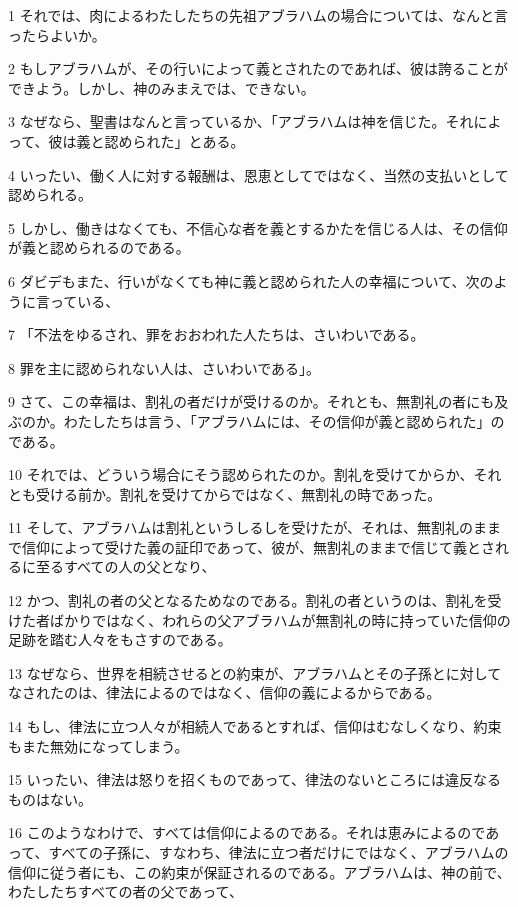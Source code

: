 \par 1 それでは、肉によるわたしたちの先祖アブラハムの場合については、なんと言ったらよいか。
\par 2 もしアブラハムが、その行いによって義とされたのであれば、彼は誇ることができよう。しかし、神のみまえでは、できない。
\par 3 なぜなら、聖書はなんと言っているか、「アブラハムは神を信じた。それによって、彼は義と認められた」とある。
\par 4 いったい、働く人に対する報酬は、恩恵としてではなく、当然の支払いとして認められる。
\par 5 しかし、働きはなくても、不信心な者を義とするかたを信じる人は、その信仰が義と認められるのである。
\par 6 ダビデもまた、行いがなくても神に義と認められた人の幸福について、次のように言っている、
\par 7 「不法をゆるされ、罪をおおわれた人たちは、さいわいである。
\par 8 罪を主に認められない人は、さいわいである」。
\par 9 さて、この幸福は、割礼の者だけが受けるのか。それとも、無割礼の者にも及ぶのか。わたしたちは言う、「アブラハムには、その信仰が義と認められた」のである。
\par 10 それでは、どういう場合にそう認められたのか。割礼を受けてからか、それとも受ける前か。割礼を受けてからではなく、無割礼の時であった。
\par 11 そして、アブラハムは割礼というしるしを受けたが、それは、無割礼のままで信仰によって受けた義の証印であって、彼が、無割礼のままで信じて義とされるに至るすべての人の父となり、
\par 12 かつ、割礼の者の父となるためなのである。割礼の者というのは、割礼を受けた者ばかりではなく、われらの父アブラハムが無割礼の時に持っていた信仰の足跡を踏む人々をもさすのである。
\par 13 なぜなら、世界を相続させるとの約束が、アブラハムとその子孫とに対してなされたのは、律法によるのではなく、信仰の義によるからである。
\par 14 もし、律法に立つ人々が相続人であるとすれば、信仰はむなしくなり、約束もまた無効になってしまう。
\par 15 いったい、律法は怒りを招くものであって、律法のないところには違反なるものはない。
\par 16 このようなわけで、すべては信仰によるのである。それは恵みによるのであって、すべての子孫に、すなわち、律法に立つ者だけにではなく、アブラハムの信仰に従う者にも、この約束が保証されるのである。アブラハムは、神の前で、わたしたちすべての者の父であって、

